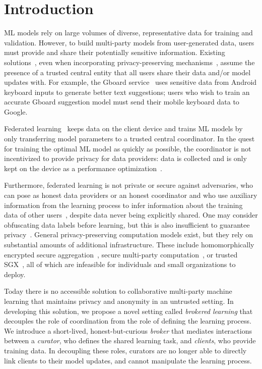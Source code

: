 \chapter{Introduction}
\label{sec:intro}

\ac{ML} models rely on large volumes of diverse,
representative data for training and validation. However, to build
multi-party models from user-generated data, users must provide and
share their potentially sensitive information. Existing 
solutions~\cite{Low:2012, Li:2014}, even when incorporating
privacy-preserving mechanisms~\cite{Abadi:2016}, assume
the presence of a trusted central entity that all users share
their data and/or model updates with. For example, the Gboard
service~\cite{Gboard:2017} uses sensitive data from Android keyboard
inputs to generate better text suggestions; users who wish to train
an accurate Gboard suggestion model must send their mobile keyboard
data to Google.

Federated learning~\cite{McMahan:2017} keeps data on the client device
and trains ML models by only transferring model parameters to a trusted
central coordinator. In the quest for training the optimal ML model as
quickly as possible, the coordinator is not incentivized to provide
privacy for data providers: data is collected and is only kept on the
device as a performance optimization~\cite{McMahan:2017}.  

Furthermore, federated learning is not private or secure against
adversaries, who can pose as honest data providers or an honest
coordinator and who use auxiliary information from the learning process to
infer information about the training data of other 
users~\cite{Hitaj:2017}, despite data never being
explicitly shared. One may consider obfuscating data labels before
learning, but this is also insufficient to guarantee 
privacy~\cite{Calandrino:2011}. General privacy-preserving computation
models exist, but they rely on substantial amounts of additional
infrastructure. These include homomorphically encrypted secure
aggregation~\cite{Bonawitz:2017}, secure multi-party 
computation~\cite{Mohassel:2017}, or trusted \ac{SGX}~\cite{Ohrimenko:2016}, 
all of which are infeasible for
individuals and small organizations to deploy.

Today there is no accessible solution to collaborative multi-party
machine learning that maintains privacy and anonymity in an untrusted
setting. In developing this solution, we propose a novel setting
called \textit{brokered learning} that decouples the role of
coordination from the role of defining the learning process. We
introduce a short-lived, honest-but-curious \emph{broker} that mediates
interactions between a \emph{curator}, who defines the shared learning
task, and \emph{clients}, who provide training data. In decoupling
these roles, curators are no longer able to directly link clients to
their model updates, and cannot manipulate the learning
process.

